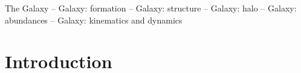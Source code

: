 \documentclass[fleqn,usenatbib]{mnras}
\begin{document}
\begin{keywords}
The Galaxy -- Galaxy: formation -- Galaxy: structure -- Galaxy: halo -- Galaxy: abundances -- Galaxy: kinematics and dynamics
\end{keywords}




\section{Introduction} \label{sec:introduction}
\end{document}
